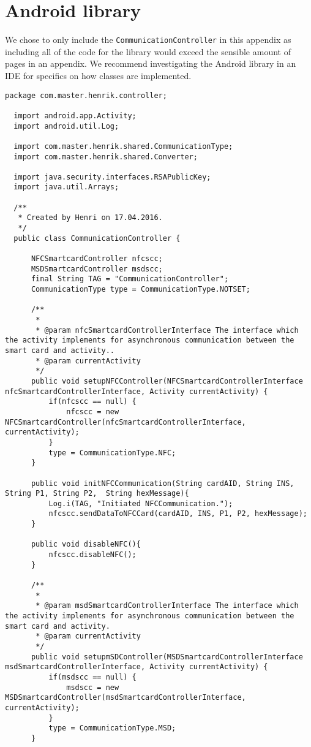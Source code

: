 \chapter{Android library}
We chose to only include the \texttt{CommunicationController} in this appendix as including all of the code for the library would exceed the sensible amount of pages in an appendix. We recommend investigating the Android library in an IDE for specifics on how classes are implemented.
\label{app:b}
\begin{lstlisting}[caption=CommunicationController.java.,breaklines=true,breakatwhitespace=false, label=lst:CommunicationController,escapechar=å]
  package com.master.henrik.controller;

  import android.app.Activity;
  import android.util.Log;

  import com.master.henrik.shared.CommunicationType;
  import com.master.henrik.shared.Converter;

  import java.security.interfaces.RSAPublicKey;
  import java.util.Arrays;

  /**
   * Created by Henri on 17.04.2016.
   */
  public class CommunicationController {

      NFCSmartcardController nfcscc;
      MSDSmartcardController msdscc;
      final String TAG = "CommunicationController";
      CommunicationType type = CommunicationType.NOTSET;

      /**
       *
       * @param nfcSmartcardControllerInterface The interface which the activity implements for asynchronous communication between the smart card and activity..
       * @param currentActivity
       */
      public void setupNFCController(NFCSmartcardControllerInterface nfcSmartcardControllerInterface, Activity currentActivity) {
          if(nfcscc == null) {
              nfcscc = new NFCSmartcardController(nfcSmartcardControllerInterface, currentActivity);
          }
          type = CommunicationType.NFC;
      }

      public void initNFCCommunication(String cardAID, String INS, String P1, String P2,  String hexMessage){
          Log.i(TAG, "Initiated NFCCommunication.");
          nfcscc.sendDataToNFCCard(cardAID, INS, P1, P2, hexMessage);
      }

      public void disableNFC(){
          nfcscc.disableNFC();
      }

      /**
       *
       * @param msdSmartcardControllerInterface The interface which the activity implements for asynchronous communication between the smart card and activity.
       * @param currentActivity
       */
      public void setupmSDController(MSDSmartcardControllerInterface msdSmartcardControllerInterface, Activity currentActivity) {
          if(msdscc == null) {
              msdscc = new MSDSmartcardController(msdSmartcardControllerInterface, currentActivity);
          }
          type = CommunicationType.MSD;
      }


\end{lstlisting}
